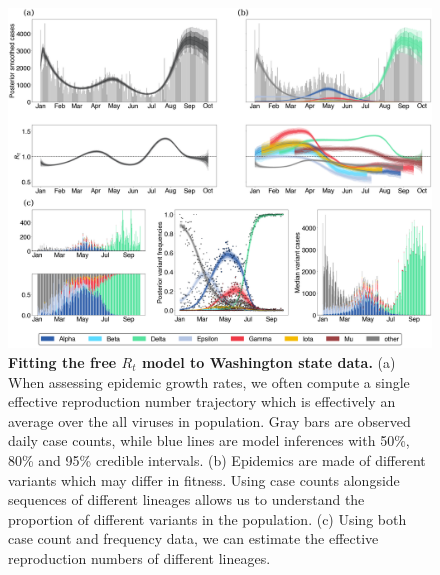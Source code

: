 \documentclass[11pt,oneside,letterpaper]{article}
\begin{document}
\begin{figure}[h!]
  \centering
  \includegraphics[width=\linewidth]{figs/free_rt_Washington.png}
  \caption{\textbf{Fitting the free $R_{t}$ model to Washington state data.}
    (a) When assessing epidemic growth rates, we often compute a single effective reproduction number trajectory which is effectively an average over the all viruses in population.
    Gray bars are observed daily case counts, while blue lines are model inferences with 50\%, 80\% and 95\% credible intervals.
    (b) Epidemics are made of different variants which may differ in fitness. Using case counts alongside sequences of different lineages allows us to understand the proportion of different variants in the population.
(c) Using both case count and frequency data, we can estimate the effective reproduction numbers of different lineages.}%
  \label{fig:free_rt_Washington}
\end{figure}
\end{document}

